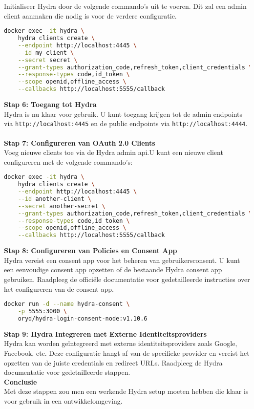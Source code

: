 Initialiseer Hydra door de volgende commando's uit te voeren. Dit zal een admin client aanmaken die nodig is voor de verdere configuratie.
\begin{lstlisting}[language=bash, caption=Hydra Initialiseren]
docker exec -it hydra \
    hydra clients create \
    --endpoint http://localhost:4445 \
    --id my-client \
    --secret secret \
    --grant-types authorization_code,refresh_token,client_credentials \
    --response-types code,id_token \
    --scope openid,offline_access \
    --callbacks http://localhost:5555/callback
\end{lstlisting}
\textbf{Stap 6: Toegang tot Hydra}\\
Hydra is nu klaar voor gebruik. U kunt toegang krijgen tot de admin endpoints via \texttt{http://localhost:4445} en de public endpoints via \texttt{http://localhost:4444}.\\\\
\textbf{Stap 7: Configureren van OAuth 2.0 Clients}\\
Voeg nieuwe clients toe via de Hydra admin \gls{api}.\@ U kunt een nieuwe client configureren met de volgende commando's:
\begin{lstlisting}[language=bash, caption=Hydra OAuth 2.0 Client configureren]
docker exec -it hydra \
    hydra clients create \
    --endpoint http://localhost:4445 \
    --id another-client \
    --secret another-secret \
    --grant-types authorization_code,refresh_token,client_credentials \
    --response-types code,id_token \
    --scope openid,offline_access \
    --callbacks http://localhost:5555/callback
\end{lstlisting}
\textbf{Stap 8: Configureren van Policies en Consent App}\\
Hydra vereist een consent app voor het beheren van gebruikersconsent. U kunt een eenvoudige consent app opzetten of de bestaande Hydra consent app gebruiken. Raadpleeg de officiële documentatie voor gedetailleerde instructies over het configureren van de consent app.
\begin{lstlisting}[language=bash, caption=Hydra Consent App starten]
docker run -d --name hydra-consent \
    -p 5555:3000 \
    oryd/hydra-login-consent-node:v1.10.6
\end{lstlisting}
\textbf{Stap 9: Hydra Integreren met Externe Identiteitsproviders}\\
Hydra kan worden geïntegreerd met externe identiteitsproviders zoals Google, Facebook, etc. Deze configuratie hangt af van de specifieke provider en vereist het opzetten van de juiste credentials en redirect URLs. Raadpleeg de Hydra documentatie voor gedetailleerde stappen.\\
\textbf{Conclusie}\\
Met deze stappen zou men een werkende Hydra setup moeten hebben die klaar is voor gebruik in een ontwikkelomgeving.


